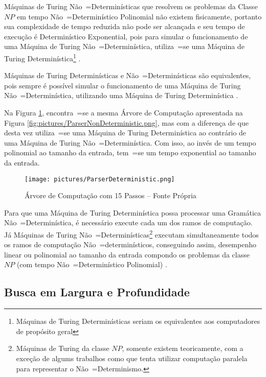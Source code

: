 {    Máquinas de Turing Não~=Determinísticas que resolvem os problemas da Classe $NP$ em tempo Não~=Determinístico Polinomial não existem fisicamente,
    portanto sua complexidade de tempo reduzida não pode ser alcançada e
    seu tempo de execução é Determinístico Exponential,
    pois para simular o funcionamento de uma Máquina de Turing Não~=Determinística,
    utiliza~=se uma Máquina de Turing Determinística\footnote{
    Máquinas de Turing Determinísticas seriam os equivalentes aos computadores de propósito geral
    }
    \cite{sipserBook,turingMachinesRoyer}.

    Máquinas de Turing Determinísticas e
    Não~=Determinísticas são equivalentes,
    pois sempre é possível simular o funcionamento de uma Máquina de Turing Não~=Determinística,
    utilizando uma Máquina de Turing Determinística \cite{hopcroftBook}.

    Na Figura \ref{fig:pictures/ParserDeterministic.png},
    encontra~=se a mesma Árvore de Computação apresentada na Figura \ref{fig:pictures/ParserNonDeterministic.png},
    mas com a diferença de que desta vez utiliza~=se uma Máquina de Turing Determinística ao contrário de uma Máquina de Turing Não~=Determinística.
    Com isso,
    ao invés de um tempo polinomial ao tamanho da entrada,
    tem~=se um tempo exponential ao tamanho da entrada.
    \begin{figure}[h]
    \centering
    \texttt{[image: pictures/ParserDeterministic.png]}
    \caption[Árvore de Computação com 15 Passos]{Árvore de Computação com 15 Passos -- Fonte Própria}
    \label{fig:pictures/ParserDeterministic.png}
    \end{figure}

    Para que uma Máquina de Turing Determinística possa processar uma Gramática Não~=Determinística,
    é necessário execute cada um dos ramos de computação.
    Já Máquinas de Turing Não~=Determinísticas\footnote{
    Máquinas de Turing da classe $NP$,
    somente existem teoricamente,
    com a exceção de algums trabalhos como  que tenta utilizar computação paralela para representar o Não~=Determinismo.
    }
    executam simultaneamente todos os ramos de computação Não~=determinísticos,
    conseguindo assim, desempenho linear ou
    polinomial ao tamanho da entrada compondo os problemas da classe $NP$ (com tempo Não~=Determinístico Polinomial) \cite{hopcroftBook}.


\subsection{Busca em Largura e Profundidade}
\label{buscaEmLarguraEProfundidade}

}

